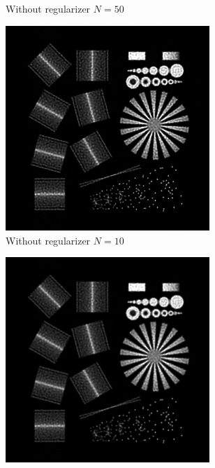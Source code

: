 \documentclass{juliacon}
\begin{document}
\begin{figure}[h]
\begin{subfigure}[b]{.25\textwidth}
                \caption{Without regularizer $N=50$}
                \label{fig:fabiob}
            \end{subfigure}%
            \hfill
            \begin{subfigure}[b]{.25\textwidth}
                \centering
                \includegraphics[width=0.85\textwidth]{figures/resolution_test_chart_no_reg_iter_10.png}
                \caption{Without regularizer $N=10$}
                \label{fig:fabioc}
            \end{subfigure}%
            \hfill
            \begin{subfigure}[b]{.25\textwidth}
                \centering
                \includegraphics[width=0.85\textwidth]{figures/resolution_test_chart_regularizer_008_iter_21.png}

\end{subfigure}
\end{figure}
\end{document}
